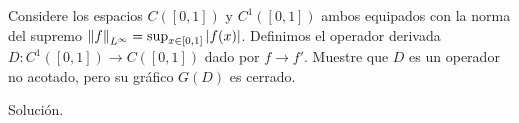 \begin{homeworkProblem}
  Considere los espacios $C([0,1])$ y $C^{1}([0,1])$ ambos equipados con la norma del supremo $\left\|f\right\|_{L^{\infty}}=\sup_{x\in [0,1]}|f(x)|$. Definimos el operador derivada $D:C^{1}([0,1])\to C([0,1])$ dado por $f\to f'$. Muestre que $D$ es un operador no acotado, pero su gráfico $G(D)$ es cerrado. 
  \begin{solution}
    Solución.
  \end{solution}
\end{homeworkProblem}
